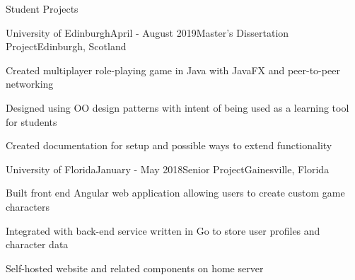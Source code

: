 \documentclass[
	11pt, %
]{resume} %
\begin{document}
\begin{rSection}{Student Projects}

	\begin{rSubsection}{University of Edinburgh}{April - August 2019}{Master's Dissertation Project}{Edinburgh, Scotland}
		\item Created multiplayer role-playing game in Java with JavaFX and peer-to-peer networking
		\item Designed using OO design patterns with intent of being used as a learning tool for students
		\item Created documentation for setup and possible ways to extend functionality
	\end{rSubsection}


	\begin{rSubsection}{University of Florida}{January - May 2018}{Senior Project}{Gainesville, Florida}
		\item Built front end Angular web application allowing users to create custom game characters
		\item Integrated with back-end service written in Go to store user profiles and character data
		\item Self-hosted website and related components on home server
	\end{rSubsection}

\end{rSection}
\end{document}
